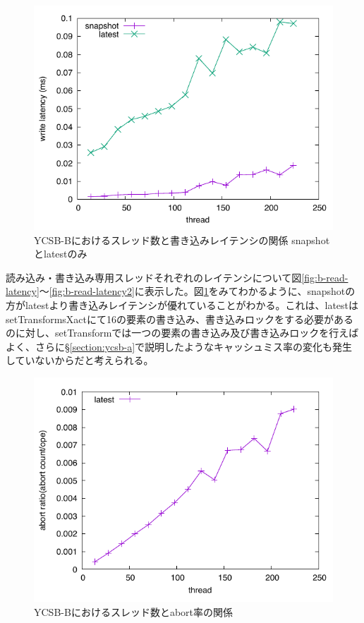 \documentclass[a4paper]{jreport}	%
\begin{document}
\begin{figure}[h] 
\centering
\includegraphics[width=15cm]{ycsb-b/opposite-write-latency2}
\caption{YCSB-Bにおけるスレッド数と書き込みレイテンシの関係 snapshotとlatestのみ}
\label{fig:b-write-latency2}
\end{figure}

読み込み・書き込み専用スレッドそれぞれのレイテンシについて図\ref{fig:b-read-latency}〜\ref{fig:b-read-latency2}に表示した。図\ref{fig:b-write-latency2}をみてわかるように、snapshotの方がlatestより書き込みレイテンシが優れていることがわかる。これは、latestはsetTransformsXactにて16の要素の書き込み、書き込みロックをする必要があるのに対し、setTransformでは一つの要素の書き込み及び書き込みロックを行えばよく、さらに§\ref{section:ycsb-a}で説明したようなキャッシュミス率の変化も発生していないからだと考えられる。


\begin{figure}[h] 
\centering
\includegraphics[width=15cm]{ycsb-b/opposite-abort}
\caption{YCSB-Bにおけるスレッド数とabort率の関係}
\label{fig:b-abort}
\end{figure}
\end{document}
